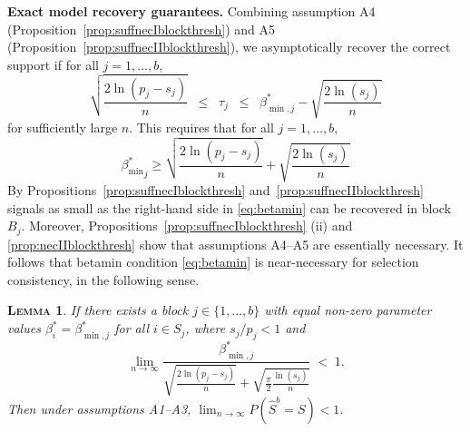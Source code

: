 \documentclass[aos]{imsart}
\theoremstyle{plain}
\newtheorem{lem}[thm]{\textsc{Lemma}}
\begin{document}
\noindent\textbf{Exact model recovery guarantees.} 
Combining assumption A4 (Proposition~\ref{prop:suffnecIblockthresh}) and A5 (Proposition~\ref{prop:suffnecIIblockthresh}),
we asymptotically recover the correct support if for all $j=1,\ldots,b$,
\begin{equation*}
  \sqrt{\frac{2\ln(p_j-s_j)}{n}}\;\;\leq\;\;\tau_j\;\;\leq\;\;\beta_{\min,j}^*-\sqrt{\frac{2\ln(s_j)}{n}}
\end{equation*}
for sufficiently large $n$. This requires that for all $j=1,\ldots,b$,
\begin{equation}\label{eq:betamin}
    {\beta_{\min}^*}_j \geq \sqrt{\frac{2\ln(p_j-s_j)}{n}} + \sqrt{\frac{2\ln(s_j)}{n}}
\end{equation}
By Propositions~\ref{prop:suffnecIblockthresh} and~\ref{prop:suffnecIIblockthresh} signals as small as the right-hand side in \eqref{eq:betamin} can be recovered in block $B_j$. Moreover, Propositions~\ref{prop:suffnecIblockthresh} (ii) and \ref{prop:necIIblockthresh} show that assumptions A4--A5 are essentially necessary. It follows that betamin condition \eqref{eq:betamin} is near-necessary for selection consistency, in the following sense.
\begin{lem}\label{lem:necbetaminblockthresh}
    If there exists a block $j\in\{1,\ldots,b\}$ with equal non-zero parameter values $\beta^*_i=\beta_{\min,j}^*$ for all $i \in S_j$, where $s_j/p_j<1$ and
    \begin{equation}\label{eq:necbetaminblockthresh}
      \lim_{n\to \infty}\frac{\beta_{\min,j}^*}{\sqrt{\tfrac{2\ln(p_j-s_j)}{n}}+\sqrt{\tfrac{\pi}{2}\tfrac{\ln(s_j)}{n}}}\;<\; 1 .
    \end{equation}
Then under assumptions A1--A3,\;  $\lim_{n \rightarrow \infty} P(\hat{S}^{b} = S) < 1$.
\end{lem}



\bigskip
\end{document}
